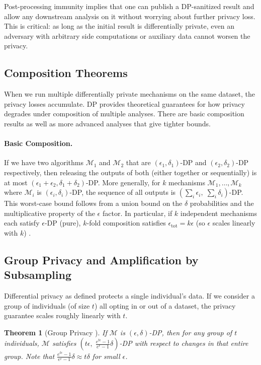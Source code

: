 \documentclass[11pt, a4paper]{article}
\newtheorem{theorem}{Theorem}
\begin{document}
Post-processing immunity implies that one can publish a DP-sanitized result and allow any downstream analysis on it without worrying about further privacy loss. This is critical: as long as the initial result is differentially private, even an adversary with arbitrary side computations or auxiliary data cannot worsen the privacy.

\subsection{Composition Theorems}

When we run multiple differentially private mechanisms on the same dataset, the privacy losses accumulate. DP provides theoretical guarantees for how privacy degrades under composition of multiple analyses. There are basic composition results as well as more advanced analyses that give tighter bounds.

\paragraph{Basic Composition.} If we have two algorithms $\mathcal{M}_1$ and $\mathcal{M}_2$ that are $(\epsilon_1,\delta_1)$-DP and $(\epsilon_2,\delta_2)$-DP respectively, then releasing the outputs of both (either together or sequentially) is at most $(\epsilon_1+\epsilon_2, \delta_1+\delta_2)$-DP. More generally, for $k$ mechanisms $\mathcal{M}_1,\dots,\mathcal{M}_k$ where $\mathcal{M}_i$ is $(\epsilon_i,\delta_i)$-DP, the sequence of all outputs is $(\sum_{i}\epsilon_i,\; \sum_{i}\delta_i)$-DP. This worst-case bound follows from a union bound on the $\delta$ probabilities and the multiplicative property of the $\epsilon$ factor. In particular, if $k$ independent mechanisms each satisfy $\epsilon$-DP (pure), $k$-fold composition satisfies $\epsilon_\text{tot} = k\epsilon$ (so $\epsilon$ scales linearly with $k$) \cite{DworkRoth2014}.

\subsection{Group Privacy and Amplification by Subsampling}

Differential privacy as defined protects a single individual's data. If we consider a group of individuals (of size $t$) all opting in or out of a dataset, the privacy guarantee scales roughly linearly with $t$.

\begin{theorem}[Group Privacy \cite{DworkRoth2014}]
If $\mathcal{M}$ is $(\epsilon,\delta)$-DP, then for any group of $t$ individuals,
$\mathcal{M}$ satisfies $(t\epsilon,\; \frac{e^{t\epsilon}-1}{e^{\epsilon}-1}\delta)$-DP with respect to changes in that entire group.
Note that $\frac{e^{t\epsilon}-1}{e^{\epsilon}-1}\delta\approx t\delta$ for small $\epsilon$.
\end{theorem}
\end{document}
